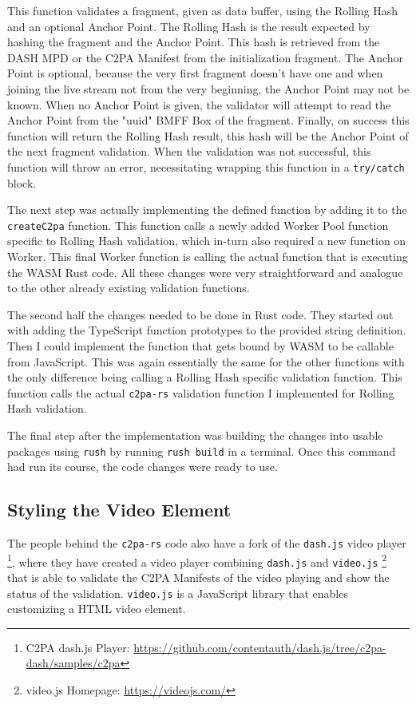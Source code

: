 This function validates a fragment, given as data buffer, using the Rolling Hash and an optional Anchor Point. The Rolling Hash is the result expected by hashing the fragment and the Anchor Point. This hash is retrieved from the DASH MPD or the C2PA Manifest from the initialization fragment. The Anchor Point is optional, because the very first fragment doesn't have one and when joining the live stream not from the very beginning, the Anchor Point may not be known. When no Anchor Point is given, the validator will attempt to read the Anchor Point from the "uuid" BMFF Box of the fragment. Finally, on success this function will return the Rolling Hash result, this hash will be the Anchor Point of the next fragment validation. When the validation was not successful, this function will throw an error, necessitating wrapping this function in a \texttt{try/catch} block.

The next step was actually implementing the defined function by adding it to the \texttt{createC2pa} function. This function calls a newly added Worker Pool function specific to Rolling Hash validation, which in-turn also required a new function on Worker. This final Worker function is calling the actual function that is executing the WASM Rust code. All these changes were very straightforward and analogue to the other already existing validation functions.

The second half the changes needed to be done in Rust code. They started out with adding the TypeScript function prototypes to the provided string definition. Then I could implement the function that gets bound by WASM to be callable from JavaScript. This was again essentially the same for the other functions with the only difference being calling a Rolling Hash specific validation function. This function calls the actual \texttt{c2pa-rs} validation function I implemented for Rolling Hash validation.

The final step after the implementation was building the changes into usable packages using \texttt{rush} by running \texttt{rush build} in a terminal. Once this command had run its course, the code changes were ready to use.

\subsection{Styling the Video Element}

The people behind the \texttt{c2pa-rs} code also have a fork of the \texttt{dash.js} video player \footnote{C2PA dash.js Player: \url{https://github.com/contentauth/dash.js/tree/c2pa-dash/samples/c2pa}}, where they have created a video player combining \texttt{dash.js} and \texttt{video.js} \footnote{video.js Homepage: \url{https://videojs.com/}} that is able to validate the C2PA Manifests of the video playing and show the status of the validation. \texttt{video.js} is a JavaScript library that enables customizing a HTML video element.

